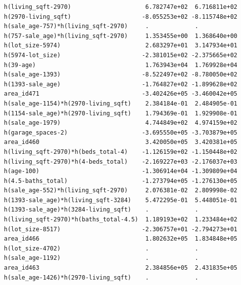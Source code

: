 \documentclass[
]{article}
\begin{document}
\begin{verbatim}
h(living_sqft-2970)                     6.782747e+02  6.716811e+02
h(2970-living_sqft)                    -8.055253e+02 -8.115748e+02
h(sale_age-757)*h(living_sqft-2970)     .             .           
h(757-sale_age)*h(living_sqft-2970)     1.353455e+00  1.368640e+00
h(lot_size-5974)                        2.683297e+01  3.147934e+01
h(5974-lot_size)                       -2.381015e+02 -2.375665e+02
h(39-age)                               1.763943e+04  1.769928e+04
h(sale_age-1393)                       -8.522497e+02 -8.780050e+02
h(1393-sale_age)                       -1.764827e+02 -1.899628e+02
area_id471                             -3.402426e+05 -3.460042e+05
h(sale_age-1154)*h(2970-living_sqft)    2.384184e-01  2.484905e-01
h(1154-sale_age)*h(2970-living_sqft)    1.794369e-01  1.929908e-01
h(sale_age-1979)                        4.744849e+02  4.974159e+02
h(garage_spaces-2)                     -3.695550e+05 -3.703879e+05
area_id460                              3.420050e+05  3.420381e+05
h(living_sqft-2970)*h(beds_total-4)    -1.126159e+02 -1.150448e+02
h(living_sqft-2970)*h(4-beds_total)    -2.169227e+03 -2.176037e+03
h(age-100)                             -1.306914e+04 -1.309809e+04
h(4.5-baths_total)                     -1.273794e+05 -1.276130e+05
h(sale_age-552)*h(living_sqft-2970)     2.076381e-02  2.809998e-02
h(1393-sale_age)*h(living_sqft-3284)    5.472295e-01  5.448051e-01
h(1393-sale_age)*h(3284-living_sqft)    .             .           
h(living_sqft-2970)*h(baths_total-4.5)  1.189193e+02  1.233484e+02
h(lot_size-8517)                       -2.306757e+01 -2.794273e+01
area_id466                              1.802632e+05  1.834848e+05
h(lot_size-4702)                        .             .           
h(sale_age-1192)                        .             .           
area_id463                              2.384856e+05  2.431835e+05
h(sale_age-1426)*h(2970-living_sqft)    .             .           
                                                                  

\end{verbatim}
\end{document}
